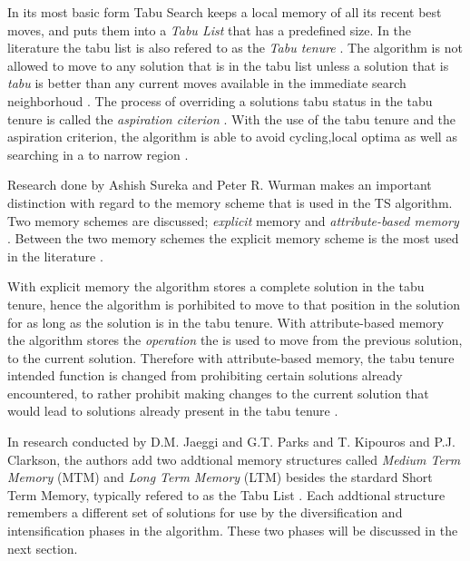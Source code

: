 In its most basic form Tabu Search keeps a local memory of all its recent best moves, and puts them into a \emph{Tabu List} that has a predefined size. In the literature the tabu list is also refered to as the \emph{Tabu tenure} \cite{TSHazardous,TabuCarryOver,ReactiveTabuVHR,TabuParameterization}. The algorithm is not allowed to move to any solution that is in the tabu list unless a solution that is \emph{tabu} is better than any current moves available in the immediate search neighborhoud \cite{TSHazardous,TabuCarryOver,ReactiveTabuVHR,TabuParameterization}. The process of overriding a solutions tabu status in the tabu tenure is called the \emph{aspiration citerion} \cite{TSHazardous,TabuCarryOver,ReactiveTabuVHR,TabuParameterization}. With the use of the tabu tenure and the aspiration criterion, the algorithm is able to avoid cycling,local optima as well as searching in a to narrow region \cite{TabuSingleMachineScheduling,CircuitTabu}.

Research done by Ashish Sureka and Peter R. Wurman makes an important distinction with regard to the memory scheme that is used in the TS algorithm. Two memory schemes are discussed; \emph{explicit} memory and \emph{attribute-based memory} \cite{TabuBiddingStrats,TabuFormGames}. Between the two memory schemes the explicit memory scheme is the most used in the literature \cite{TabuVechicleRoutingWithTimeWindows}.

With explicit memory the algorithm stores a complete solution in the tabu tenure, hence the algorithm is porhibited to move to that position in the solution for as long as the solution is in the tabu tenure\cite{TabuBiddingStrats,TabuFormGames}. With attribute-based memory the algorithm stores the \emph{operation} the is used to move from the previous solution, to the current solution\cite{TabuBiddingStrats,TabuFormGames}. Therefore with attribute-based memory, the tabu tenure intended function is changed from prohibiting certain solutions already encountered, to rather prohibit making changes to the current solution that would lead to solutions already present in the tabu tenure \cite{TabuBiddingStrats,TabuFormGames}.

In research conducted by D.M. Jaeggi and G.T. Parks and T. Kipouros and P.J. Clarkson, the authors add two addtional memory structures called \emph{Medium Term Memory} (MTM) and \emph{Long Term Memory} (LTM) besides the stardard Short Term Memory, typically refered to as the Tabu List \cite{MultiObjTabu} . Each addtional structure remembers a different set of solutions for use by the diversification and intensification phases in the algorithm. These two phases will be discussed in the next section.

